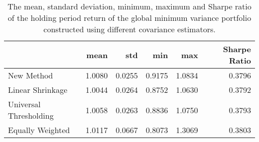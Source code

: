 \begin{table}
\centering
\caption{The mean, standard deviation, minimum, maximum and Sharpe ratio of the holding period return of the global minimum variance portfolio constructed using different covariance estimators.}
\label{t5}
\begin{tabular}{lrrrrr}
\toprule
{} &          mean &           std &             min &    max &  Sharpe Ratio \\
\midrule
New Method             &        1.0080 &        0.0255 &          0.9175 & 1.0834 &        0.3796 \\
Linear Shrinkage       &        1.0044 &        0.0264 &          0.8752 & 1.0630 &        0.3792 \\
Universal Thresholding &        1.0058 &        0.0263 &          0.8836 & 1.0750 &        0.3793 \\
Equally Weighted       &        1.0117 &        0.0667 &          0.8073 & 1.3069 &        0.3803 \\
\bottomrule
\end{tabular}
\end{table}
